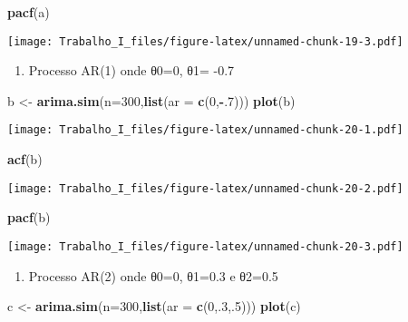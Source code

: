 \documentclass[]{article}
\newenvironment{Shaded}{\begin{snugshade}}{\end{snugshade}}
\newcommand{\KeywordTok}[1]{\textcolor[rgb]{0.13,0.29,0.53}{\textbf{#1}}}
\newcommand{\DataTypeTok}[1]{\textcolor[rgb]{0.13,0.29,0.53}{#1}}
\newcommand{\DecValTok}[1]{\textcolor[rgb]{0.00,0.00,0.81}{#1}}
\newcommand{\StringTok}[1]{\textcolor[rgb]{0.31,0.60,0.02}{#1}}
\newcommand{\OperatorTok}[1]{\textcolor[rgb]{0.81,0.36,0.00}{\textbf{#1}}}
\newcommand{\NormalTok}[1]{#1}
\providecommand{\tightlist}{%
  \setlength{\itemsep}{0pt}\setlength{\parskip}{0pt}}
\begin{document}
\begin{Shaded}
\begin{Highlighting}[]
\KeywordTok{pacf}\NormalTok{(a)}
\end{Highlighting}
\end{Shaded}

\texttt{[image: Trabalho\_I\_files/figure-latex/unnamed-chunk-19-3.pdf]}

\begin{enumerate}
\def\labelenumi{\alph{enumi})}
\setcounter{enumi}{1}
\tightlist
\item
  Processo AR(1) onde θ0=0, θ1= -0.7
\end{enumerate}

\begin{Shaded}
\begin{Highlighting}[]
\NormalTok{b <-}\StringTok{ }\KeywordTok{arima.sim}\NormalTok{(}\DataTypeTok{n=}\DecValTok{300}\NormalTok{,}\KeywordTok{list}\NormalTok{(}\DataTypeTok{ar =} \KeywordTok{c}\NormalTok{(}\DecValTok{0}\NormalTok{,}\OperatorTok{-}\NormalTok{.}\DecValTok{7}\NormalTok{)))}
\KeywordTok{plot}\NormalTok{(b)}
\end{Highlighting}
\end{Shaded}

\texttt{[image: Trabalho\_I\_files/figure-latex/unnamed-chunk-20-1.pdf]}

\begin{Shaded}
\begin{Highlighting}[]
\KeywordTok{acf}\NormalTok{(b)}
\end{Highlighting}
\end{Shaded}

\texttt{[image: Trabalho\_I\_files/figure-latex/unnamed-chunk-20-2.pdf]}

\begin{Shaded}
\begin{Highlighting}[]
\KeywordTok{pacf}\NormalTok{(b)}
\end{Highlighting}
\end{Shaded}

\texttt{[image: Trabalho\_I\_files/figure-latex/unnamed-chunk-20-3.pdf]}

\begin{enumerate}
\def\labelenumi{\alph{enumi})}
\setcounter{enumi}{2}
\tightlist
\item
  Processo AR(2) onde θ0=0, θ1=0.3 e θ2=0.5
\end{enumerate}

\begin{Shaded}
\begin{Highlighting}[]
\NormalTok{c <-}\StringTok{ }\KeywordTok{arima.sim}\NormalTok{(}\DataTypeTok{n=}\DecValTok{300}\NormalTok{,}\KeywordTok{list}\NormalTok{(}\DataTypeTok{ar =} \KeywordTok{c}\NormalTok{(}\DecValTok{0}\NormalTok{,.}\DecValTok{3}\NormalTok{,.}\DecValTok{5}\NormalTok{)))}
\KeywordTok{plot}\NormalTok{(c)}
\end{Highlighting}
\end{Shaded}
\end{document}
